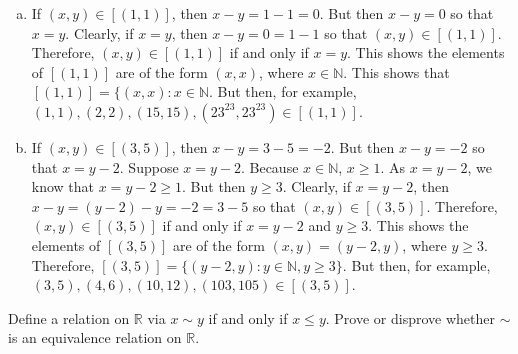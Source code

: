 \documentclass[11pt,letterpaper]{article}
\begin{document}
\begin{enumerate}[(a)]
\item If $(x, y) \in [(1, 1)]$, then $x - y= 1 - 1= 0$. But then $x - y= 0$ so that $x= y$. Clearly, if $x= y$, then $x - y= 0= 1 - 1$ so that $(x, y) \in [(1, 1)]$. Therefore, $(x, y) \in [(1, 1)]$ if and only if $x= y$. This shows the elements of $[(1, 1)]$ are of the form $(x, x)$, where $x \in \mathbb{N}$. This shows that $[(1, 1)]= \{ (x, x) \colon x \in \mathbb{N}$. But then, for example, $(1, 1), (2, 2), (15, 15), (23^{23}, 23^{23}) \in [(1, 1)]$. 

\item If $(x, y) \in [(3, 5)]$, then $x - y= 3 - 5= - 2$. But then $x - y= -2$ so that $x= y - 2$. Suppose $x= y - 2$. Because $x \in \mathbb{N}$, $x \geq 1$. As $x= y - 2$, we know that $x= y - 2 \geq 1$. But then $y \geq 3$. Clearly, if $x= y - 2$, then $x - y= (y - 2) - y= -2= 3 - 5$ so that $(x, y) \in [(3, 5)]$. Therefore, $(x, y) \in [(3, 5)]$ if and only if $x= y - 2$ and $y \geq 3$. This shows the elements of $[(3, 5)]$ are of the form $(x, y)= (y - 2, y)$, where $y \geq 3$. Therefore, $[(3, 5)]= \{ (y - 2, y) \colon y \in \mathbb{N}, y \geq 3 \}$. But then, for example, $(3, 5), (4, 6), (10, 12), (103, 105) \in [(3, 5)]$. 
\end{enumerate}



\newpage



  Define a relation on $\mathbb{R}$ via $x \sim y$ if and only if $x \leq y$. Prove or disprove whether $\sim$ is an equivalence relation on $\mathbb{R}$. \pspace
\end{document}
